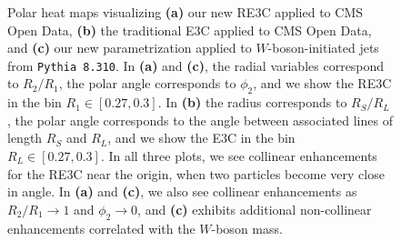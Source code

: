 \begin{figure}
    \centering
    \caption[Polar heat maps of three-point energy correlators.]{
        Polar heat maps visualizing \textbf{(a)} our new RE3C applied to CMS Open Data, \textbf{(b)} the traditional E3C applied to CMS Open Data, and \textbf{(c)} our new parametrization applied to $W$-boson-initiated jets from \texttt{Pythia 8.310}.
        In \textbf{(a)} and \textbf{(c)}, the radial variables correspond to \(R_2/R_1\), the polar angle corresponds to \(\phi_2\), and we show the RE3C in the bin $R_1 \in [0.27,0.3]$.
        In \textbf{(b)} the radius corresponds to \(R_S/R_L\), the polar angle corresponds to the angle between associated lines of length \(R_S\) and \(R_L\), and we show the E3C in the bin $R_L \in [0.27,0.3]$.
        In all three plots, we see collinear enhancements for the RE3C near the origin, when two particles become very close in angle.
        In \textbf{(a)} and \textbf{(c)}, we also see collinear enhancements as \(R_2/R_1 \to 1\) and \(\phi_2 \to 0\), and \textbf{(c)} exhibits additional non-collinear enhancements correlated with the \(W\)-boson mass.
    }
	\label{fig:bullseye}%
\end{figure}



